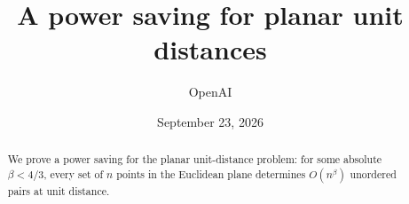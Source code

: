 \documentclass[11pt]{article}
\title{A power saving for planar unit distances}
\author{OpenAI}
\date{September 23, 2026}
\theoremstyle{definition}
\newcommand{\1}{\mathbf 1}
\numberwithin{equation}{section}
\begin{document}
\maketitle
\begin{abstract}
We prove a power saving for the planar unit-distance problem: for some absolute \(\beta<4/3\), every set of \(n\) points in the Euclidean plane determines \(O(n^\beta)\) unordered pairs at unit distance.
\end{abstract}










\end{document}
